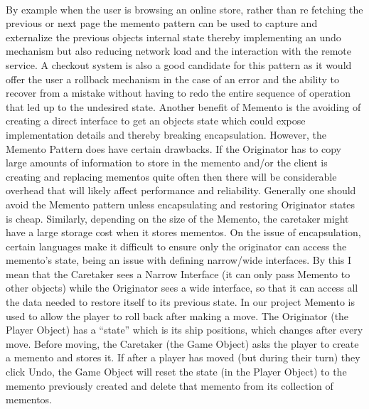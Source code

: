 	\begin{multicols}{2}
	\paragraph{}
		\vspace{8 mm}
		By example when the user is browsing an online store, rather than re fetching the previous or next page the memento pattern can be used to 
		capture and externalize the previous objects internal state thereby implementing an undo mechanism but also reducing network load and the 
		interaction with the remote service. A checkout system is also a good candidate for this pattern as it would offer the user a rollback 
		mechanism in the case of an error and the ability to recover from a mistake without having to redo the entire sequence of operation that 
		led up to the undesired state.
		\newline
		\newline
		Another benefit of Memento is the avoiding of creating a direct interface to get an objects state which could expose implementation 
		details and thereby breaking encapsulation.
		\newline
		\newline
		However, the Memento Pattern does have certain drawbacks.  If the Originator has to copy large amounts of information to store in the 
		memento and/or the client is creating and replacing mementos quite often then there will be considerable overhead that will likely 
		affect performance and reliability. Generally one should avoid the Memento pattern unless encapsulating and restoring Originator 
		states is cheap.
		\newline
		\newline
		Similarly, depending on the size of the Memento, the caretaker might have a large storage cost when it stores mementos.
		On the issue of encapsulation, certain languages make it difficult to ensure only the originator can access the memento’s state, 
		being an issue with defining narrow/wide interfaces. By this I mean that the Caretaker sees a Narrow Interface (it can only pass 
		Memento to other objects) while the Originator sees a wide interface, so that it can access all the data needed to restore itself 
		to its previous state.
		\newline
		In our project Memento is used to allow the player to roll back after making a move. The Originator (the Player Object) has a “state” 
		which is its ship positions, which changes after every move. Before moving, the Caretaker (the Game Object) asks the player to create 
		a memento and stores it.
		\newline
		If after a player has moved (but during their turn) they click Undo, the Game Object will reset the state (in the Player Object) 
		to the memento previously created and delete that memento from its collection of mementos.
	\end{multicols}	
